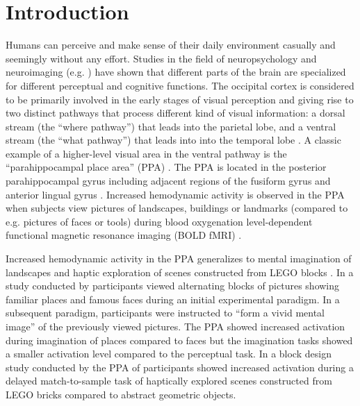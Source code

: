 \documentclass[english]{article}
\begin{document}
\section{Introduction}


Humans can perceive and make sense of their daily environment casually and
seemingly without any effort.
%
Studies in the field of neuropsychology and neuroimaging (e.g.
\citep{penfield1950cerebral, fox1984noninvasive}) have shown that different
parts of the brain are specialized for different perceptual and cognitive
functions.
The occipital cortex is considered to be primarily involved in the early stages
of visual perception and giving rise to two distinct pathways that process
different kind of visual information:
a dorsal stream (the ``where pathway'') that leads into the parietal lobe, and a
ventral stream (the ``what pathway'') that leads into into the temporal lobe
\citep{goodale1992separate, mishkin1982contribution}.
A classic example of a higher-level visual area in the ventral pathway is the
``parahippocampal place area'' (PPA) \citep{epstein1998ppa,
epstein1999parahippocampal}.
The PPA is located in the posterior parahippocampal gyrus including adjacent
regions of the fusiform gyrus and anterior lingual gyrus
\citep{epstein2008parahippocampal}.
Increased hemodynamic activity is observed in the PPA when subjects view
pictures of landscapes, buildings or landmarks (compared to e.g. pictures of
faces or tools) during blood oxygenation level-dependent functional magnetic
resonance imaging (BOLD fMRI) \citep{aguirre1998area, epstein2014neural,
epstein1998ppa, troiani2012object}.

Increased hemodynamic activity in the PPA generalizes to mental imagination of
landscapes \citep{ocraven2000mental} and haptic exploration of scenes
constructed from LEGO blocks \citep{wolbers2011modality}.
In a study conducted by \cite{ocraven2000mental} participants viewed alternating
blocks of pictures showing familiar places and famous faces during an initial
experimental paradigm.
In a subsequent paradigm, participants were instructed to ``form a vivid mental
image'' of the previously viewed pictures.
The PPA showed increased activation during imagination of places compared to
faces but the imagination tasks showed a smaller activation level compared to
the perceptual task.
In a block design study conducted by \cite{wolbers2011modality} the PPA of
participants showed increased activation during a delayed
match-to-sample task of haptically explored scenes constructed from LEGO bricks
compared to abstract geometric objects.
\end{document}
